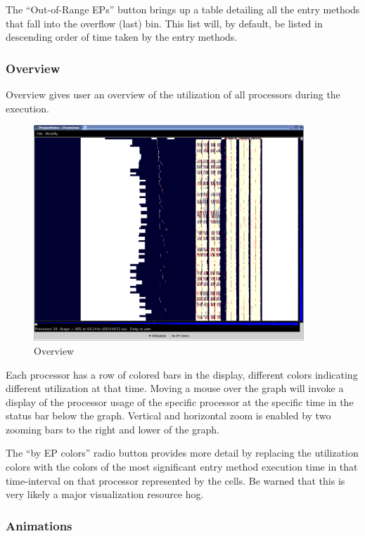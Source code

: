 \documentclass[10pt]{article}
\begin{document}
The ``Out-of-Range EPs'' button brings up a table detailing all the
entry methods that fall into the overflow (last) bin. This list will,
by default, be listed in descending order of time taken by the entry
methods.

\subsubsection{Overview}

Overview gives user an overview of the utilization of all processors
during the execution. 

\begin{figure}[htb]
\center
\includegraphics[width=4.0in]{fig/overview}
\caption{Overview}
\label{overview}
\end{figure}

Each processor has a row of colored bars in the display, different
colors indicating different utilization at that time. Moving a mouse
over the graph will invoke a display of the processor usage of the
specific processor at the specific time in the status bar below the
graph. Vertical and horizontal zoom is enabled by two zooming bars to
the right and lower of the graph.

The ``by EP colors'' radio button provides more detail by replacing
the utilization colors with the colors of the most significant entry
method execution time in that time-interval on that processor
represented by the cells. Be warned that this is very likely a major
visualization resource hog.

\subsubsection{Animations}
\end{document}
